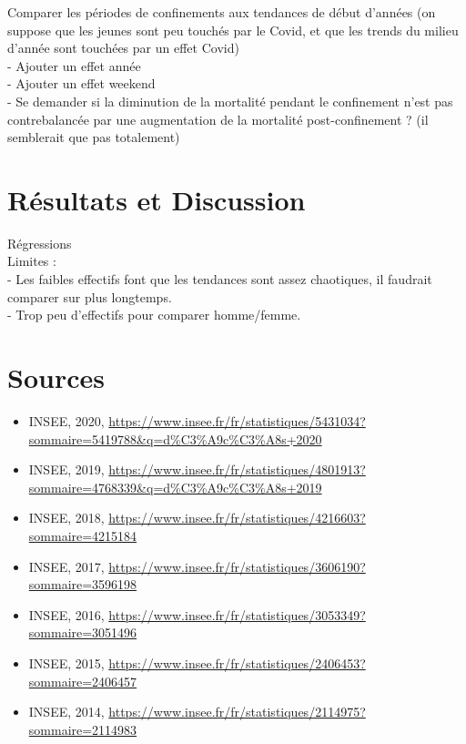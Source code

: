 \documentclass{article}
\begin{document}
Comparer les périodes de confinements aux tendances de début d'années (on suppose que les jeunes sont peu touchés par le Covid, et que les trends du milieu d'année sont touchées par un effet Covid)\\

- Ajouter un effet année \\

- Ajouter un effet weekend \\

- Se demander si la diminution de la mortalité pendant le confinement n'est pas contrebalancée par une augmentation de la mortalité post-confinement ? (il semblerait que pas totalement)\\





\section{Résultats et Discussion}

Régressions \\


Limites : \\

- Les faibles effectifs font que les tendances sont assez chaotiques, il faudrait comparer sur plus longtemps. \\

- Trop peu d'effectifs pour comparer homme/femme. \\



\section{Sources} \label{source}

\begin{itemize}
\item INSEE, 2020, \url{https://www.insee.fr/fr/statistiques/5431034?sommaire=5419788&q=d\%C3\%A9c\%C3\%A8s+2020}
\item INSEE, 2019, \url{https://www.insee.fr/fr/statistiques/4801913?sommaire=4768339&q=d\%C3\%A9c\%C3\%A8s+2019}
\item INSEE, 2018, \url{https://www.insee.fr/fr/statistiques/4216603?sommaire=4215184}
\item INSEE, 2017, \url{https://www.insee.fr/fr/statistiques/3606190?sommaire=3596198}
\item INSEE, 2016, \url{https://www.insee.fr/fr/statistiques/3053349?sommaire=3051496}
\item INSEE, 2015, \url{https://www.insee.fr/fr/statistiques/2406453?sommaire=2406457}
\item INSEE, 2014, \url{https://www.insee.fr/fr/statistiques/2114975?sommaire=2114983}
\end{itemize}
\end{document}
